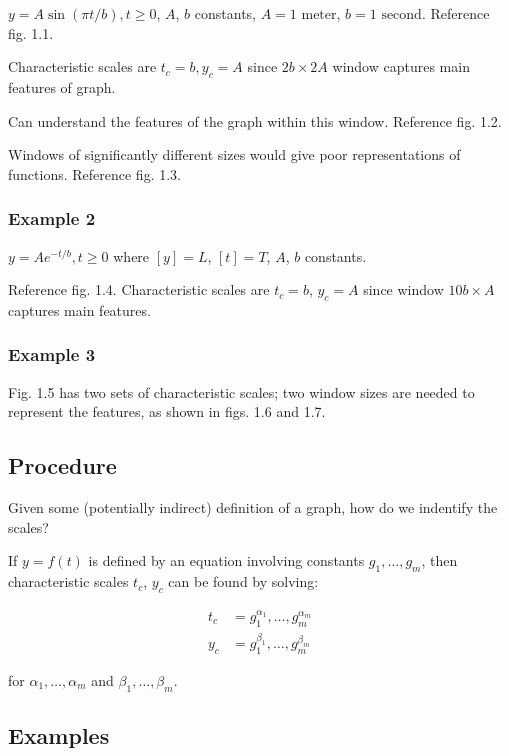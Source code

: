 \documentclass[12pt]{article}
\begin{document}
$y=A\sin(\pi t/b), t \ge 0$, $A$, $b$ constants, $A = 1 \text{ meter}$, $b=1
\text{ second}$. Reference fig. 1.1.

Characteristic scales are $t_c=b, y_c=A$ since $2b \times 2A$ window captures
main features of graph.

Can understand the features of the graph within this window. Reference fig. 1.2.

Windows of significantly different sizes would give poor representations of
functions. Reference fig. 1.3.

\subsubsection{Example 2}

$y = Ae^{-t/b}, t\ge0$ where $[y]=L$, $[t] = T$, $A$, $b$ constants.

Reference fig. 1.4. Characteristic scales are $t_c=b$, $y_c=A$ since window
$10b \times A$ captures main features.

\subsubsection{Example 3}

Fig. 1.5 has two sets of characteristic scales; two window sizes are needed to
represent the features, as shown in figs. 1.6 and 1.7.

\subsection{Procedure}
Given some (potentially indirect) definition of a graph, how do we indentify the
scales?

If $y=f(t)$ is defined by an equation involving constants $g_1, \ldots, g_m$,
then characteristic scales $t_c$, $y_c$ can be found by solving:

\begin{equation}
  \begin{aligned}
    t_c &= g_1^{\alpha_1}, \ldots, g_m^{\alpha_m} \\
    y_c &= g_1^{\beta_1}, \ldots, g_m^{\beta_m}
  \end{aligned}
\end{equation}

for $\alpha_1, \ldots, \alpha_m$ and $\beta_1, \ldots, \beta_m$.

\subsection{Examples}
\end{document}
